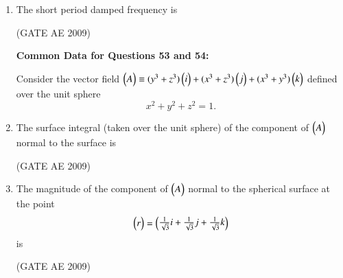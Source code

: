 \documentclass[journal,12pt,onecolumn]{IEEEtran}
\theoremstyle{remark}
\begin{document}
\begin{flushleft}
\begin{enumerate}
\item The short period damped frequency is

\hfill(GATE AE 2009)

\begin{enumerate}

\end{enumerate}

\textbf{Common Data for Questions 53 and 54:}

Consider the vector field \(\begin{pmatrix}A\end{pmatrix} \equiv (y^3 + z^3) \begin{pmatrix}i\end{pmatrix} + (x^3 + z^3) \begin{pmatrix}j\end{pmatrix} + (x^3 + y^3) \begin{pmatrix}k\end{pmatrix}\) defined over the unit sphere
\[
x^2 + y^2 + z^2 = 1.
\]

\item The surface integral (taken over the unit sphere) of the component of \(\begin{pmatrix}A\end{pmatrix}\) normal to the surface is

\hfill(GATE AE 2009)

\begin{enumerate}

\end{enumerate}

\item The magnitude of the component of \(\begin{pmatrix}A\end{pmatrix}\) normal to the spherical surface at the point
\[
\begin{pmatrix}r\end{pmatrix} = \begin{pmatrix}\frac{1}{\sqrt{3}}{i} + \frac{1}{\sqrt{3}}{j} + \frac{1}{\sqrt{3}}{k}\end{pmatrix}
\]
is

\hfill(GATE AE 2009)

\begin{enumerate}


\end{enumerate}
\end{enumerate}
\end{flushleft}
\end{document}
